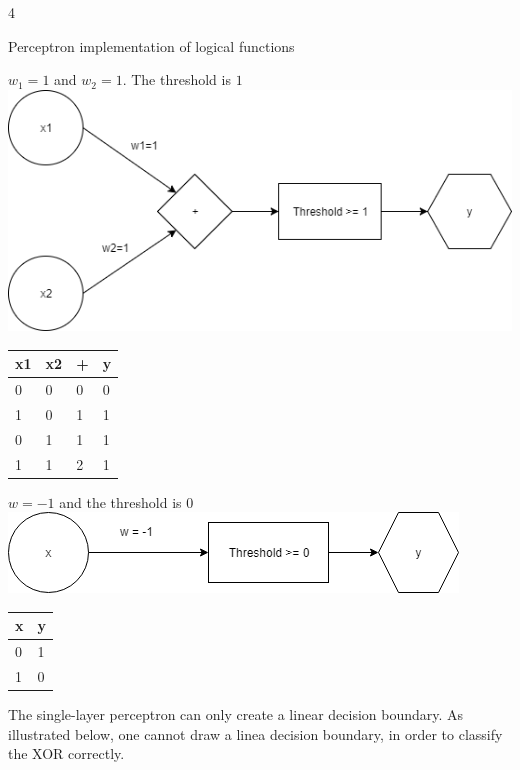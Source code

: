 \documentclass{article}
\begin{document}
\begin{ukon-infie}[22.11.17]{4}
\begin{exercise}[p=11]{Perceptron implementation of logical functions}
        	\question{}
        	{$w_1 = 1$ and $w_2 = 1$. The threshold is $1$\\
        	\includegraphics[scale=0.5]{A1b.png}
\begin{tabular}{|l|l|l|l|}
\hline
\textbf{x1} & \textbf{x2} & \textbf{+} & \textbf{y} \\ \hline
0           & 0           & 0          & 0          \\ \hline
1           & 0           & 1          & 1          \\ \hline
0           & 1           & 1          & 1          \\ \hline
1           & 1           & 2          & 1          \\ \hline
\end{tabular}
}
        	\question{}
        	{$w = -1$ and the threshold is $0$\\
        	\includegraphics[scale=0.5]{A1c.png}
\begin{tabular}{|l|l|}
\hline
\textbf{x} & \textbf{y} \\ \hline
0          & 1          \\ \hline
1          & 0          \\ \hline
\end{tabular}
}
        	\question{}
        	{
        	The single-layer perceptron can only create a linear decision boundary. As illustrated below, one cannot draw a linea decision boundary, in order to classify the XOR correctly.\\
}
\end{exercise}
\end{ukon-infie}
\end{document}
